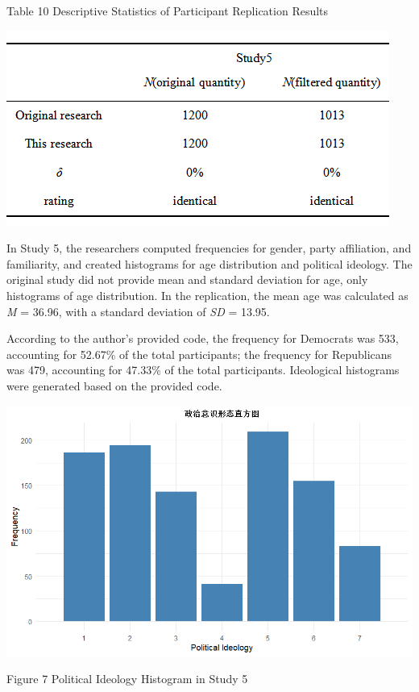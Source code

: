 \documentclass[
  man]{apa6}
\begin{document}
\begin{center}
Table 10 Descriptive Statistics of Participant Replication Results
\end{center}
\begin{center}
\includegraphics{descriiptive_5.png}
\end{center}

In Study 5, the researchers computed frequencies for gender, party affiliation, and familiarity, and created histograms for age distribution and political ideology. The original study did not provide mean and standard deviation for age, only histograms of age distribution. In the replication, the mean age was calculated as \emph{M} = 36.96, with a standard deviation of \emph{SD} = 13.95.

According to the author's provided code, the frequency for Democrats was 533, accounting for 52.67\% of the total participants; the frequency for Republicans was 479, accounting for 47.33\% of the total participants. Ideological histograms were generated based on the provided code.

\begin{center}
\includegraphics{political_5.png}
\end{center}
\begin{center}
Figure 7 Political Ideology Histogram in Study 5
\end{center}
\end{document}
